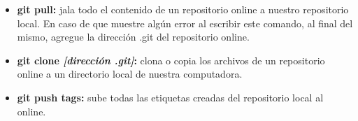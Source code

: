 \begin{itemize}
    \begin{itemize}
        \item \textbf{git pull:} jala todo el contenido de un repositorio online a nuestro repositorio local. En caso de que muestre algún error al escribir este comando, al final del mismo, agregue la dirección .git del repositorio online.
        \item \textbf{git clone \textit{[dirección .git]}:} clona o copia los archivos de un repositorio online a un directorio local de nuestra computadora.
        \item \textbf{git push tags: }sube todas las etiquetas creadas del repositorio local al online.
    \end{itemize}
\end{itemize}



